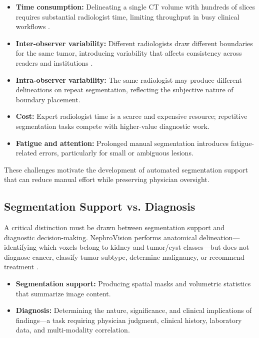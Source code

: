 \begin{itemize}
    \item \textbf{Time consumption:} Delineating a single CT volume with hundreds of slices requires substantial radiologist time, limiting throughput in busy clinical workflows \cite{manual_segmentation_time}.
    \item \textbf{Inter-observer variability:} Different radiologists draw different boundaries for the same tumor, introducing variability that affects consistency across readers and institutions \cite{interobserver_variability}.
    \item \textbf{Intra-observer variability:} The same radiologist may produce different delineations on repeat segmentation, reflecting the subjective nature of boundary placement.
    \item \textbf{Cost:} Expert radiologist time is a scarce and expensive resource; repetitive segmentation tasks compete with higher-value diagnostic work.
    \item \textbf{Fatigue and attention:} Prolonged manual segmentation introduces fatigue-related errors, particularly for small or ambiguous lesions.
\end{itemize}

These challenges motivate the development of automated segmentation support that can reduce manual effort while preserving physician oversight.

\subsection{Segmentation Support vs. Diagnosis}

A critical distinction must be drawn between segmentation support and diagnostic decision-making. NephroVision performs anatomical delineation---identifying which voxels belong to kidney and tumor/cyst classes---but does not diagnose cancer, classify tumor subtype, determine malignancy, or recommend treatment \cite{decision_support_scope}.

\begin{itemize}
    \item \textbf{Segmentation support:} Producing spatial masks and volumetric statistics that summarize image content.
    \item \textbf{Diagnosis:} Determining the nature, significance, and clinical implications of findings---a task requiring physician judgment, clinical history, laboratory data, and multi-modality correlation.
\end{itemize}

